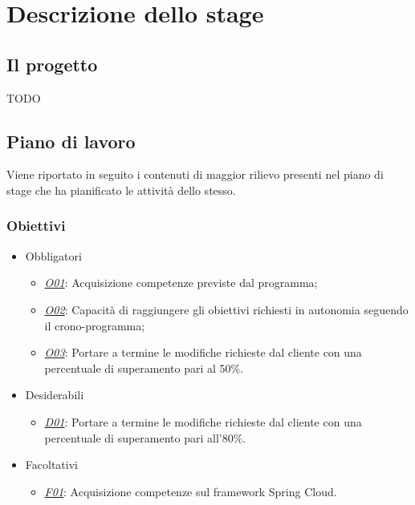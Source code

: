 
\chapter{Descrizione dello stage}\label{cap:descrizione-stage}



\section{Il progetto}

TODO

\section{Piano di lavoro}

Viene riportato in seguito i contenuti di maggior rilievo presenti nel piano di stage che ha pianificato
le attività dello stesso.

\subsection{Obiettivi}

\begin{itemize}[noitemsep]
	\item Obbligatori
	\begin{itemize}
		\item \underline{\textit{O01}}: Acquisizione competenze previste dal programma;
		\item \underline{\textit{O02}}: Capacità di raggiungere gli obiettivi richiesti in autonomia seguendo il crono-programma;
		\item \underline{\textit{O03}}: Portare a termine le modifiche richieste dal cliente con una percentuale di superamento pari al 50\%.
	\end{itemize}
	\item Desiderabili
	\begin{itemize}
		\item \underline{\textit{D01}}: Portare a termine le modifiche richieste dal cliente con una percentuale di superamento pari all'80\%.
	\end{itemize}
	\item Facoltativi
	\begin{itemize}
		\item \underline{\textit{F01}}: Acquisizione competenze sul framework Spring Cloud.
	\end{itemize}
\end{itemize}

